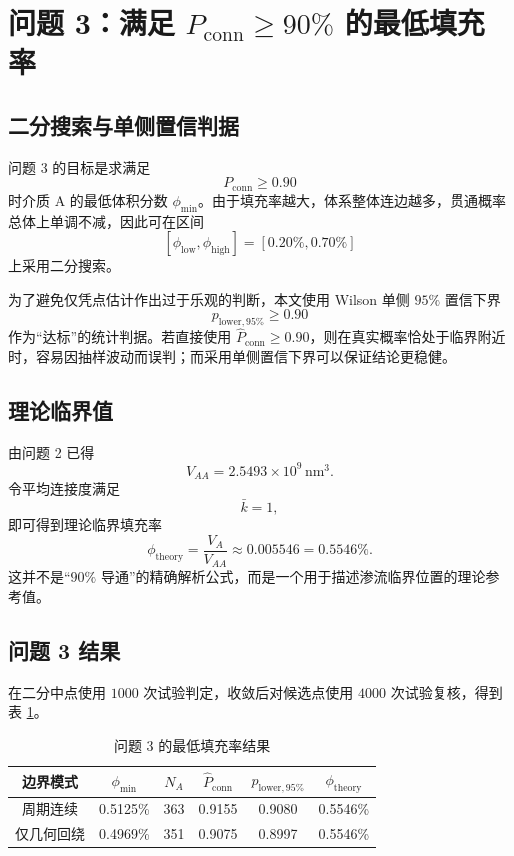 \section{问题 3：满足 \texorpdfstring{$P_{\mathrm{conn}}\ge 90\%$}{Pconn>=90\%} 的最低填充率}

\subsection{二分搜索与单侧置信判据}

问题 3 的目标是求满足
\[
P_{\mathrm{conn}}\ge 0.90
\]
时介质 A 的最低体积分数 $\phi_{\min}$。由于填充率越大，体系整体连边越多，贯通概率总体上单调不减，因此可在区间
\[
[\phi_{\mathrm{low}},\phi_{\mathrm{high}}]=[0.20\%,0.70\%]
\]
上采用二分搜索。

为了避免仅凭点估计作出过于乐观的判断，本文使用 Wilson 单侧 $95\%$ 置信下界
\[
p_{\mathrm{lower},95\%}\ge 0.90
\]
作为“达标”的统计判据。若直接使用 $\hat{P}_{\mathrm{conn}}\ge 0.90$，则在真实概率恰处于临界附近时，容易因抽样波动而误判；而采用单侧置信下界可以保证结论更稳健。

\subsection{理论临界值}

由问题 2 已得
\[
V_{AA}=2.5493\times 10^9\,\mathrm{nm}^3.
\]
令平均连接度满足
\[
\bar{k}=1,
\]
即可得到理论临界填充率
\[
\phi_{\mathrm{theory}}=\frac{V_A}{V_{AA}}\approx 0.005546=0.5546\%.
\]
这并不是“$90\%$ 导通”的精确解析公式，而是一个用于描述渗流临界位置的理论参考值。

\subsection{问题 3 结果}

在二分中点使用 $1000$ 次试验判定，收敛后对候选点使用 $4000$ 次试验复核，得到表 \ref{tab:q3_result}。

\begin{table}[htbp]
    \centering
    \caption{问题 3 的最低填充率结果}
    \label{tab:q3_result}
    \begin{tabular}{cccccc}
        \hline
        边界模式 & $\phi_{\min}$ & $N_A$ & $\hat{P}_{\mathrm{conn}}$ & $p_{\mathrm{lower},95\%}$ & $\phi_{\mathrm{theory}}$ \\
        \hline
        周期连续 & 0.5125\% & 363 & 0.9155 & 0.9080 & 0.5546\% \\
        仅几何回绕 & 0.4969\% & 351 & 0.9075 & 0.8997 & 0.5546\% \\
        \hline
    \end{tabular}
\end{table}

